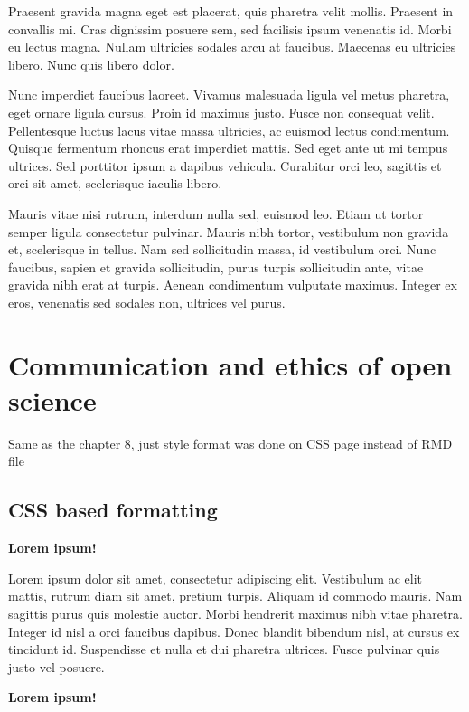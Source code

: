 \documentclass[
]{book}
\begin{document}
Praesent gravida magna eget est placerat, quis pharetra velit mollis. Praesent in convallis mi. Cras dignissim posuere sem, sed facilisis ipsum venenatis id. Morbi eu lectus magna. Nullam ultricies sodales arcu at faucibus. Maecenas eu ultricies libero. Nunc quis libero dolor.

Nunc imperdiet faucibus laoreet. Vivamus malesuada ligula vel metus pharetra, eget ornare ligula cursus. Proin id maximus justo. Fusce non consequat velit. Pellentesque luctus lacus vitae massa ultricies, ac euismod lectus condimentum. Quisque fermentum rhoncus erat imperdiet mattis. Sed eget ante ut mi tempus ultrices. Sed porttitor ipsum a dapibus vehicula. Curabitur orci leo, sagittis et orci sit amet, scelerisque iaculis libero.

Mauris vitae nisi rutrum, interdum nulla sed, euismod leo. Etiam ut tortor semper ligula consectetur pulvinar. Mauris nibh tortor, vestibulum non gravida et, scelerisque in tellus. Nam sed sollicitudin massa, id vestibulum orci. Nunc faucibus, sapien et gravida sollicitudin, purus turpis sollicitudin ante, vitae gravida nibh erat at turpis. Aenean condimentum vulputate maximus. Integer ex eros, venenatis sed sodales non, ultrices vel purus.

\hypertarget{communication-and-ethics-of-open-science}{%
\chapter{Communication and ethics of open science}\label{communication-and-ethics-of-open-science}}

Same as the chapter 8, just style format was done on CSS page instead of RMD file

\hypertarget{css-based-formatting}{%
\section{CSS based formatting}\label{css-based-formatting}}

\textbf{Lorem ipsum!}

Lorem ipsum dolor sit amet, consectetur adipiscing elit. Vestibulum ac elit mattis, rutrum diam sit amet, pretium turpis. Aliquam id commodo mauris. Nam sagittis purus quis molestie auctor. Morbi hendrerit maximus nibh vitae pharetra. Integer id nisl a orci faucibus dapibus. Donec blandit bibendum nisl, at cursus ex tincidunt id. Suspendisse et nulla et dui pharetra ultrices. Fusce pulvinar quis justo vel posuere.

\textbf{Lorem ipsum!}
\end{document}
